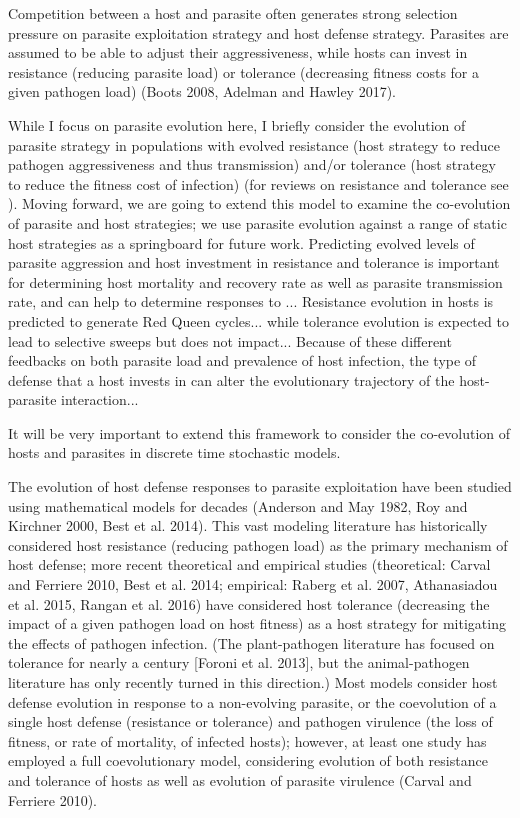 Competition between a host and parasite often generates strong selection pressure on parasite exploitation strategy and host defense strategy. Parasites are assumed to be able to adjust their aggressiveness, while hosts can invest in resistance (reducing parasite load) or tolerance (decreasing fitness costs for a given pathogen load) (Boots 2008, Adelman and Hawley 2017). 

While I focus on parasite evolution here, I briefly consider the evolution of parasite strategy in populations with evolved resistance (host strategy to reduce pathogen aggressiveness and thus transmission) and/or tolerance (host strategy to reduce the fitness cost of infection) (for reviews on resistance and tolerance see \citealt{SchneiderandAyres2008, AyresandSchneider2012, KutzerandArmitage2016}). Moving forward, we are going to extend this model to examine the co-evolution of parasite and host strategies; we use parasite evolution against a range of static host strategies as a springboard for future work. Predicting evolved levels of parasite aggression and host investment in resistance and tolerance is important for determining host mortality and recovery rate as well as parasite transmission rate, and can help to determine responses to ... Resistance evolution in hosts is predicted to generate Red Queen cycles... while tolerance evolution is expected to lead to selective sweeps but does not impact... Because of these different feedbacks on both parasite load and prevalence of host infection, the type of defense that a host invests in can alter the evolutionary trajectory of the host-parasite interaction... 

It will be very important to extend this framework to consider the co-evolution of hosts and parasites in discrete time stochastic models.

The evolution of host defense responses to parasite exploitation have been studied using mathematical models for decades (Anderson and May 1982, Roy and Kirchner 2000, Best et al. 2014). This vast modeling literature has historically considered host resistance (reducing pathogen load) as the primary mechanism of host defense; more recent theoretical and empirical studies (theoretical: Carval and Ferriere 2010, Best et al. 2014; empirical: Raberg et al. 2007, Athanasiadou et al. 2015, Rangan et al. 2016) have considered host tolerance (decreasing the impact of a given pathogen load on host fitness) as a host strategy for mitigating the effects of pathogen infection. (The plant-pathogen literature has focused on tolerance for nearly a century [Foroni et al. 2013], but the animal-pathogen literature has only recently turned in this direction.) Most models consider host defense evolution in response to a non-evolving parasite, or the coevolution of a single host defense (resistance or tolerance) and pathogen virulence (the loss of fitness, or rate of mortality, of infected hosts); however, at least one study has employed a full coevolutionary model, considering evolution of both resistance and tolerance of hosts as well as evolution of parasite virulence (Carval and Ferriere 2010). 

